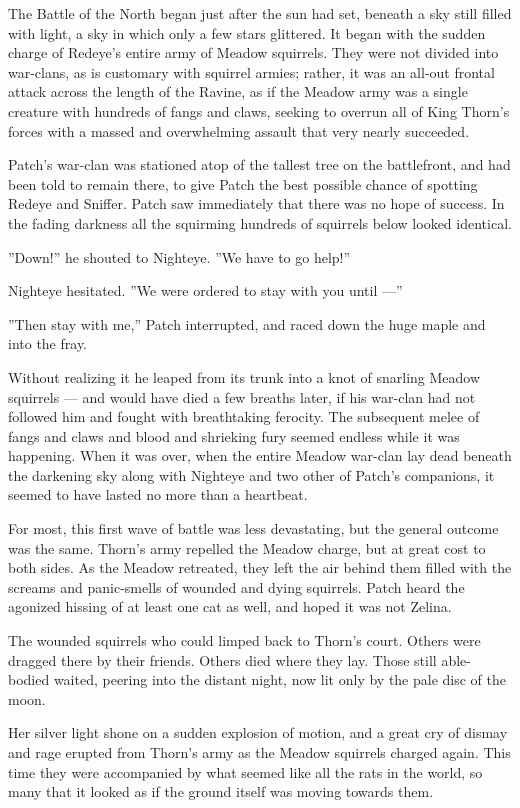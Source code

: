 \documentclass[12pt]{book}
\begin{document}
The Battle of the North began just after the sun had set, beneath a
sky still filled with light, a sky in which only a few stars
glittered. It began with the sudden charge of Redeye's entire army of
Meadow squirrels. They were not divided into war-clans, as is
customary with squirrel armies; rather, it was an all-out frontal
attack across the length of the Ravine, as if the Meadow army was a
single creature with hundreds of fangs and claws, seeking to overrun
all of King Thorn's forces with a massed and overwhelming assault that
very nearly succeeded.

Patch's war-clan was stationed atop of the tallest tree on the
battlefront, and had been told to remain there, to give Patch the best
possible chance of spotting Redeye and Sniffer. Patch saw immediately
that there was no hope of success. In the fading darkness all the
squirming hundreds of squirrels below looked identical.

''Down!'' he shouted to Nighteye. ''We have to go help!''

Nighteye hesitated. ''We were ordered to stay with you until ---''

''Then stay with me,'' Patch interrupted, and raced down the huge
maple and into the fray.

Without realizing it he leaped from its trunk into a knot of snarling
Meadow squirrels --- and would have died a few breaths later, if his
war-clan had not followed him and fought with breathtaking
ferocity. The subsequent melee of fangs and claws and blood and
shrieking fury seemed endless while it was happening. When it was
over, when the entire Meadow war-clan lay dead beneath the darkening
sky along with Nighteye and two other of Patch's companions, it seemed
to have lasted no more than a heartbeat.

For most, this first wave of battle was less devastating, but the
general outcome was the same. Thorn's army repelled the Meadow charge,
but at great cost to both sides. As the Meadow retreated, they left
the air behind them filled with the screams and panic-smells of
wounded and dying squirrels. Patch heard the agonized hissing of at
least one cat as well, and hoped it was not Zelina.

The wounded squirrels who could limped back to Thorn's court. Others
were dragged there by their friends. Others died where they lay. Those
still able-bodied waited, peering into the distant night, now lit only
by the pale disc of the moon.

Her silver light shone on a sudden explosion of motion, and a great
cry of dismay and rage erupted from Thorn's army as the Meadow
squirrels charged again. This time they were accompanied by what
seemed like all the rats in the world, so many that it looked as if
the ground itself was moving towards them.
\end{document}
